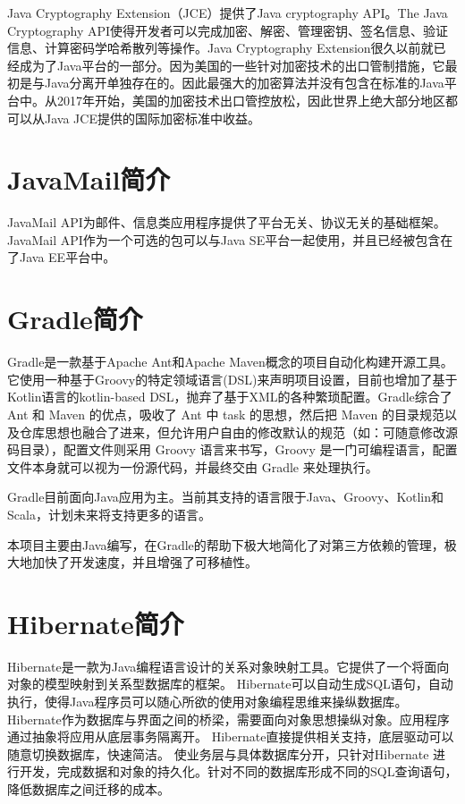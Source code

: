 Java Cryptography Extension（JCE）提供了Java cryptography API。The Java Cryptography API使得开发者可以完成加密、解密、管理密钥、签名信息、验证信息、计算密码学哈希散列等操作。Java Cryptography Extension很久以前就已经成为了Java平台的一部分。因为美国的一些针对加密技术的出口管制措施，它最初是与Java分离开单独存在的。因此最强大的加密算法并没有包含在标准的Java平台中。从2017年开始，美国的加密技术出口管控放松，因此世界上绝大部分地区都可以从Java JCE提供的国际加密标准中收益。

\section{JavaMail简介}

JavaMail API为邮件、信息类应用程序提供了平台无关、协议无关的基础框架。JavaMail API作为一个可选的包可以与Java SE平台一起使用，并且已经被包含在了Java EE平台中。

\section{Gradle简介}

Gradle是一款基于Apache Ant和Apache Maven概念的项目自动化构建开源工具。它使用一种基于Groovy的特定领域语言(DSL)来声明项目设置，目前也增加了基于Kotlin语言的kotlin-based DSL，抛弃了基于XML的各种繁琐配置。Gradle综合了 Ant 和 Maven 的优点，吸收了 Ant 中 task 的思想，然后把 Maven 的目录规范以及仓库思想也融合了进来，但允许用户自由的修改默认的规范（如：可随意修改源码目录），配置文件则采用 Groovy 语言来书写，Groovy 是一门可编程语言，配置文件本身就可以视为一份源代码，并最终交由 Gradle 来处理执行。

Gradle目前面向Java应用为主。当前其支持的语言限于Java、Groovy、Kotlin和Scala，计划未来将支持更多的语言。

本项目主要由Java编写，在Gradle的帮助下极大地简化了对第三方依赖的管理，极大地加快了开发速度，并且增强了可移植性。

\section{Hibernate简介}

Hibernate是一款为Java编程语言设计的关系对象映射工具。它提供了一个将面向对象的模型映射到关系型数据库的框架。
Hibernate可以自动生成SQL语句，自动执行，使得Java程序员可以随心所欲的使用对象编程思维来操纵数据库。
Hibernate作为数据库与界面之间的桥梁，需要面向对象思想操纵对象。应用程序通过抽象将应用从底层事务隔离开。
Hibernate直接提供相关支持，底层驱动可以随意切换数据库，快速简洁。
使业务层与具体数据库分开，只针对Hibernate 进行开发，完成数据和对象的持久化。针对不同的数据库形成不同的SQL查询语句，降低数据库之间迁移的成本。

